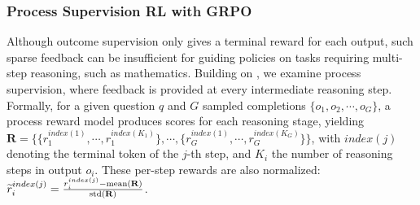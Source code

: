 \subsubsection{Process Supervision RL with GRPO}
Although outcome supervision only gives a terminal reward for each output, such sparse feedback can be insufficient for guiding policies on tasks requiring multi-step reasoning, such as mathematics. Building on \cite{wang2023math}, we examine process supervision, where feedback is provided at every intermediate reasoning step. Formally, for a given question $q$ and $G$ sampled completions $\{o_1, o_2, \cdots, o_G\}$, a process reward model produces scores for each reasoning stage, yielding $\mathbf{R} = \{ \{r_1^{index(1)},\cdots,r_1^{index(K_1)}\}, \cdots,  \{r_G^{index(1)},\cdots,r_G^{index(K_G)}\} \}$, with $index(j)$ denoting the terminal token of the $j$-th step, and $K_i$ the number of reasoning steps in output $o_i$. These per-step rewards are also normalized: $\widetilde{r}_i^{index(j)} = \frac{r_i^{index(j)} - {\rm mean(\mathbf{R})}}{{\rm std(\mathbf{R})}}$.
